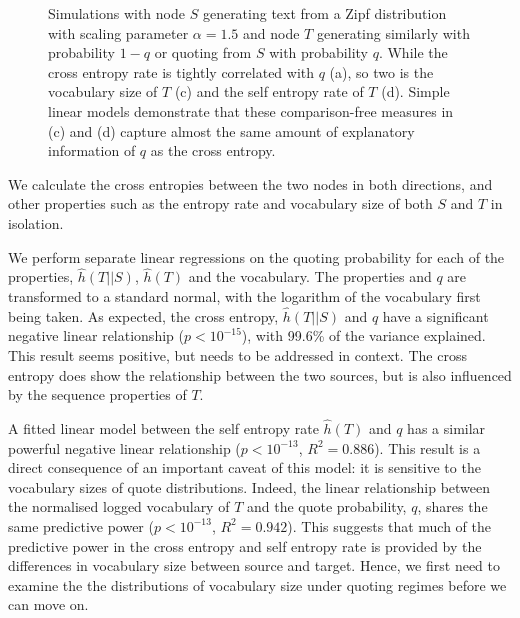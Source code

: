\begin{figure}[!htbp]
\centering

\caption{Simulations with node $S$ generating text from a Zipf distribution with scaling parameter $\alpha=1.5$ and node $T$ generating similarly with probability $1-q$ or quoting from $S$ with probability $q$. While the cross entropy rate is tightly correlated with $q$ (a), so two is the vocabulary size of $T$ (c) and the self entropy rate of $T$ (d). Simple linear models demonstrate that these comparison-free measures in (c) and (d) capture almost the same amount of explanatory information of $q$ as the cross entropy.}\label{fig:fixedalphasingleflow}
\end{figure}

We calculate the cross entropies between the two nodes in both directions, and other properties such as the entropy rate and vocabulary size of both $S$ and $T$ in isolation.

We perform separate linear regressions on the quoting probability for each of the properties, $\hat{h}(T||S)$, $\hat{h}(T)$ and the vocabulary. The properties and $q$ are transformed to a standard normal, with the logarithm of the vocabulary first being taken.
As expected, the cross entropy, $\hat{h}(T||S)$ and $q$ have a significant negative linear relationship ($p<10^{-15}$), with 99.6\% of the variance explained. This result seems positive, but needs to be addressed in context. The cross entropy does show the relationship between the two sources, but is also influenced by the sequence properties of $T$.

A fitted linear model between the self entropy rate $\hat{h}(T)$ and $q$ has a similar powerful negative linear relationship ($p<10^{-13}$, $R^2 = 0.886$). This result is a direct consequence of an important caveat of this model: it is sensitive to the vocabulary sizes of quote distributions. Indeed, the linear relationship between the normalised logged vocabulary of $T$ and the quote probability, $q$, shares the same predictive power ($p<10^{-13}$, $R^2 = 0.942$). This suggests that much of the predictive power in the cross entropy and self entropy rate is provided by the differences in vocabulary size between source and target. Hence, we first need to examine the the distributions of vocabulary size under quoting regimes before we can move on.

